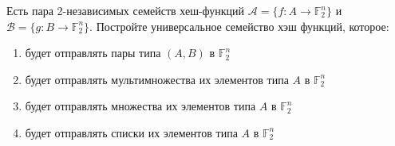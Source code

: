 \begin{task}[2]
Есть пара 2-независимых семейств хеш-функций $\mathcal{A} = \{ f:A\rightarrow \mathbb{F}_2^n \}$ и 
$\mathcal{B} = \{ g:B\rightarrow \mathbb{F}_2^n \}$. Постройте универсальное семейство хэш функций, которое:
\begin{enumerate}[label=(\alph*)]
	\item будет отправлять пары типа $(A, B)$ в $\mathbb{F}^n_2$
	\item будет отправлять мультимножества их элементов типа $A$ в $\mathbb{F}^n_2$
	\item будет отправлять множества их элементов типа $A$ в $\mathbb{F}^n_2$
	\item будет отправлять списки их элементов типа $A$ в $\mathbb{F}^n_2$
\end{enumerate}
\end{task}
